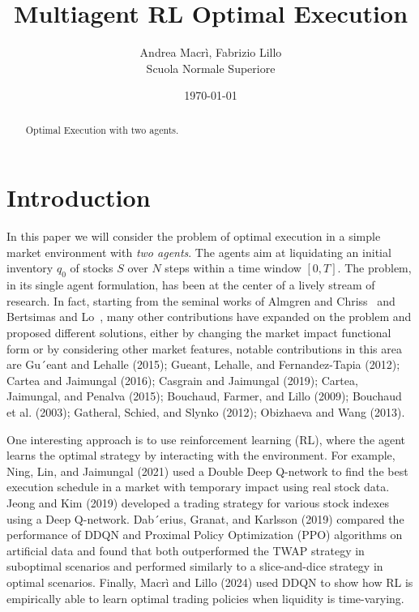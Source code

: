 \documentclass[11pt,a4paper]{article}
\begin{document}
\title{Multiagent RL Optimal Execution}
\author{Andrea Macrì, Fabrizio Lillo\\
Scuola Normale Superiore}
\date{\today}
\maketitle
\begin{abstract}
Optimal Execution with two agents.
\end{abstract}
\tableofcontents
\section{Introduction}
In this paper we will consider the problem of optimal execution in a simple market environment with \emph{two agents}. The agents aim at liquidating an initial inventory $q_0$ of stocks $S$ over $N$ steps within a time window $[0, T]$.
The problem, in its single agent formulation, has been at the center of a lively stream of research. In fact, starting from the seminal works of Almgren and Chriss~\cite{almgren} and Bertsimas and Lo~\cite{bertsimas}, 
many other contributions have expanded on the problem and proposed different solutions, either by changing the market impact functional form or by considering other market features, notable contributions in this area are Gu´eant and Lehalle (2015); Gueant, Lehalle, and
Fernandez-Tapia (2012); Cartea and Jaimungal (2016); Casgrain and Jaimungal (2019); Cartea, Jaimungal, and Penalva (2015); Bouchaud, Farmer, and Lillo (2009); Bouchaud et al. (2003); Gatheral, Schied, and Slynko (2012); Obizhaeva and Wang (2013).  

One interesting approach is to use reinforcement learning (RL), where the agent learns the optimal strategy by interacting with the environment. 
For example, Ning, Lin, and Jaimungal (2021) used a Double Deep Q-network to find the best execution schedule in a market with temporary impact using real stock data. Jeong and Kim (2019) developed a trading strategy for various 
stock indexes using a Deep Q-network. Dab´erius, Granat, and Karlsson (2019) compared the performance of DDQN and Proximal Policy Optimization (PPO) algorithms on artificial data and found that both outperformed the TWAP 
strategy in suboptimal scenarios and performed similarly to a slice-and-dice strategy in optimal scenarios. Finally, Macrì and Lillo (2024) used DDQN to show how RL is empirically able to learn optimal trading policies when liquidity 
is time-varying.\par
\end{document}
